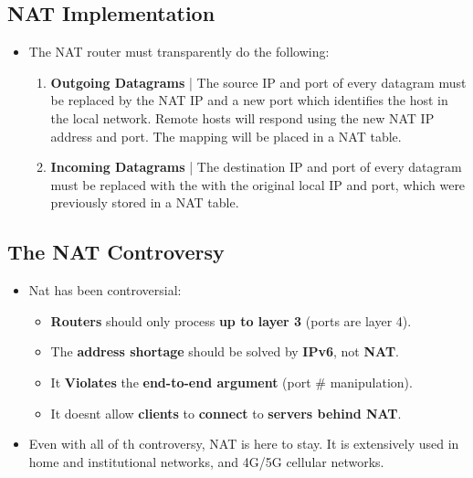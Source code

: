 \documentclass{article}
\begin{document}
    \subsection*{NAT Implementation}
    \begin{itemize}
        \item The NAT router must transparently do the following:
        \begin{enumerate}
            \item \textbf{Outgoing Datagrams} | The source IP and port of every datagram must be replaced by the NAT IP and a new port which identifies the host in the local network. Remote hosts will respond using the new NAT IP address and port. The mapping will be placed in a NAT table.
            \item \textbf{Incoming Datagrams} | The destination IP and port of every datagram must be replaced with the with the original local IP and port, which were previously stored in a NAT table.
        \end{enumerate}
    \end{itemize}

    \subsection*{The NAT Controversy}
    \begin{itemize}
        \item Nat has been controversial:
        \begin{itemize}
            \item \textbf{Routers} should only process \textbf{up to layer 3} (ports are layer 4).
            \item The \textbf{address shortage} should be solved by \textbf{IPv6}, not \textbf{NAT}.
            \item It \textbf{Violates} the \textbf{end-to-end argument} (port \# manipulation).
            \item It doesnt allow \textbf{clients} to \textbf{connect} to \textbf{servers behind NAT}.
        \end{itemize}
        \item Even with all of th controversy, NAT is here to stay. It is extensively used in home and institutional networks, and 4G/5G cellular networks.
    \end{itemize}
    
\end{document}
